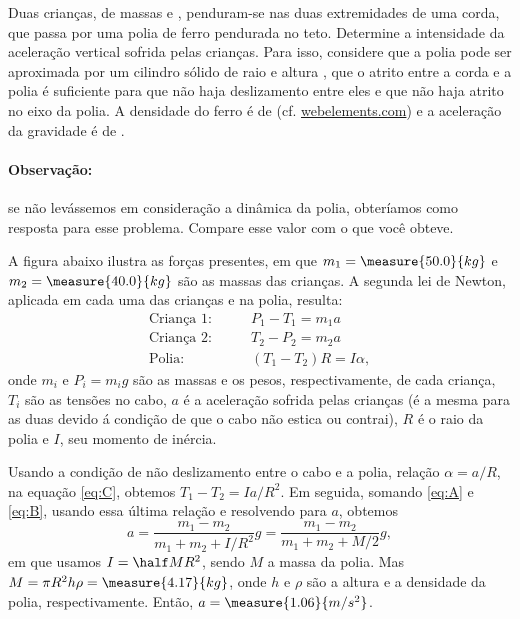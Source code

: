 \begin{question}
    Duas crianças, de massas  e , penduram-se nas duas extremidades de uma corda, que passa por uma polia de ferro pendurada no teto.
    Determine a intensidade da aceleração vertical sofrida pelas crianças.
    Para isso, considere que a polia pode ser aproximada por um cilindro sólido de raio  e altura , que o atrito entre a corda e a polia é suficiente para que não haja deslizamento entre eles e que não haja atrito no eixo da polia.
    A densidade do ferro é de  (cf. \href{https://www.webelements.com/aluminium/}{webelements.com}) e a aceleração da gravidade é de .

    \paragraph{Observação:} se não levássemos em consideração a dinâmica da polia, obteríamos  como resposta para esse problema.
    Compare esse valor com o que você obteve.

    \begin{answer}
    \end{answer}
    
    \begin{solution}
      A figura abaixo ilustra as forças presentes, em que $m_1 = \measure{50.0}{kg}$ e $m_2 = \measure{40.0}{kg}$ são as massas das crianças.
      A segunda lei de Newton, aplicada em cada uma das crianças e na polia, resulta:
      \begin{align}
        \text{Criança 1:}&\qquad P_1 - T_1 = m_1 a \label{eq:A}\\
        \text{Criança 2:}&\qquad T_2 - P_2 = m_2 a \label{eq:B}\\
        \text{Polia:}&\qquad (T_1 - T_2)R = I\alpha, \label{eq:C}
      \end{align}
      onde $m_i$ e $P_i = m_i g$ são as massas e os pesos, respectivamente, de cada criança, $T_i$ são as tensões no cabo, $a$ é a aceleração sofrida pelas crianças (é a mesma para as duas devido á condição de que o cabo não estica ou contrai), $R$ é o raio da polia e $I$, seu momento de inércia.

      Usando a condição de não deslizamento entre o cabo e a polia, relação $\alpha = a/R$, na equação \eqref{eq:C}, obtemos $T_1 - T_2 = Ia/R^2$.
      Em seguida, somando \eqref{eq:A} e \eqref{eq:B}, usando essa última relação e resolvendo para $a$, obtemos
      \begin{equation*}
        a = \frac{m_1 - m_2}{m_1 + m_2 + I/R^2}g = \frac{m_1 - m_2}{m_1 + m_2 + M/2}g,
      \end{equation*}
      em que usamos $I = \half MR^2$, sendo $M$ a massa da polia.
      Mas $M = \pi R^2 h \rho = \measure{4.17}{kg}$, onde $h$ e $\rho$ são a altura e a densidade da polia, respectivamente.
      Então, $a = \measure{1.06}{m/s^2}$.
    \end{solution}
\end{question}